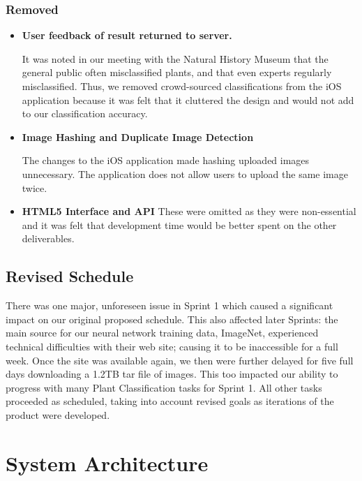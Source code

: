 \documentclass[a4paper,11pt]{article}
\begin{document}
\subsubsection{Removed}

\begin{itemize}
\item \textbf{User feedback of result returned to server.}
  
  It was noted in our meeting with the Natural History Museum that the general public often misclassified plants, and that even experts regularly misclassified. Thus, we removed crowd-sourced classifications from the iOS application because it was felt that it cluttered the design and would not add to our classification accuracy. 
  
     \item \textbf{Image Hashing and Duplicate Image Detection}
   
   The changes to the iOS application made hashing uploaded images unnecessary. The application does not allow users to upload the same image twice.
   
   \item \textbf{HTML5 Interface and API}
   These were omitted as they were non-essential and it was felt that development time would be better spent on the other deliverables.
  
\end{itemize}
     


\subsection{Revised Schedule}

There was one major, unforeseen issue in Sprint 1 which caused a significant impact on our original proposed schedule. This also affected later Sprints: the main source for our neural network training data, ImageNet, experienced technical difficulties with their web site; causing it to be inaccessible for a full week. Once the site was available again, we then were further delayed for five full days downloading a 1.2TB tar file of images. This too impacted our ability to progress with many Plant Classification tasks for Sprint 1. All other tasks proceeded as scheduled, taking into account revised goals as iterations of the product were developed.


\clearpage
\section{System Architecture}
\end{document}
